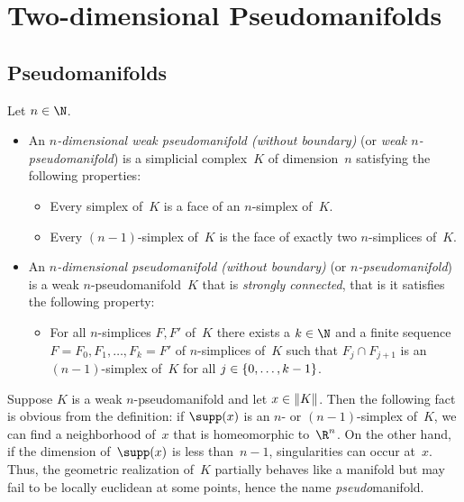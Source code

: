 \chapter{Two-dimensional Pseudomanifolds}
\section{Pseudomanifolds}
\begin{thDef}
    \label{ch4:def:pseudomanifold}
    Let $n\in\N$. 
    \begin{itemize}
        \item
            An \emph{$n$-dimensional weak pseudomanifold (without boundary)}
            (or \emph{weak $n$-pseudomanifold}) is a simplicial complex~$K$
            of dimension~$n$ satisfying the following properties:
            \begin{itemize}
                \item
                    Every simplex of~$K$ is a face of an $n$-simplex of~$K$.
                \item
                    Every $(n{-}1)$-simplex of~$K$ is the face of exactly two
                    $n$-simplices of~$K$.
            \end{itemize}
            
        \item
            An \emph{$n$-dimensional pseudomanifold (without boundary)} (or
            \emph{$n$-pseudomanifold}) is a weak $n$-pseudomanifold~$K$ that is
            \emph{strongly connected}, that is it satisfies the following
            property:
            \begin{itemize}
                \item
                    For all $n$-simplices $F,F'$ of~$K$ there exists a $k\in\N$ and a
                    finite sequence $F=F_0,F_1,\dots,F_k=F'$ of $n$-simplices of~$K$
                    such that  $F_j\cap F_{j+1}$ is an $(n{-}1)$-simplex of~$K$ 
                    for all $j\in\{0,\ldots,k-1\}$.
            \end{itemize}
            
    \end{itemize}
\end{thDef}

Suppose $K$ is a weak $n$-pseudomanifold and let $x\in\lVert K\rVert$.
Then the following fact is obvious from the definition:
if $\supp(x)$ is an $n$- or $(n{-}1)$-simplex of~$K$,
we can find a neighborhood of~$x$ that is homeomorphic
to~$\R^n$. On the other hand, if the dimension of~$\supp(x)$
is less than~$n{-}1$, singularities can occur at~$x$.
Thus, the geometric realization of~$K$ partially behaves like a manifold but may
fail to be locally euclidean at some points, hence the name \emph{pseudo}manifold.

